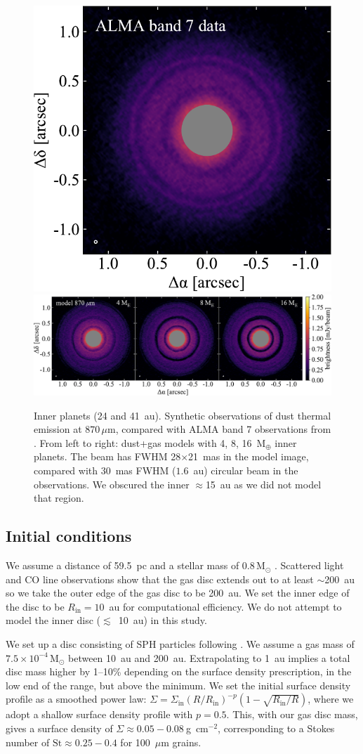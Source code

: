 \documentclass[usenatbib,a4paper,times]{mnras}
\newcommand{\st}{\mathrm{St}}
\renewcommand{\sun}{\mathrm{M}_{\odot}}
\renewcommand{\earth}{\mathrm{M}_{\oplus}}
\begin{document}
\begin{figure}
   \begin{center}
      \includegraphics[height=0.245\textwidth]{figs/andrews-2016.pdf} \quad
      \includegraphics[height=0.245\textwidth]{figs/alma-image.pdf}
      \caption{Inner planets (24 and 41~au). Synthetic observations of dust
         thermal emission at $870\,\mu$m, compared with ALMA band 7 observations
         from \citet{andrews:2016}. From left to right: dust+gas models with 4,
         8, 16~$\earth$ inner planets. The beam has FWHM 28$\times$21~mas in the
         model image, compared with 30~mas FWHM ($1.6$~au) circular beam in the
         observations. We obscured the inner $\approx$15~au as we did not model
         that region.\label{fig:alma}}
   \end{center}
\end{figure}





\subsection{Initial conditions}

We assume a distance of 59.5~pc \citep{gaia-collaboration:2016} and a stellar
mass of $0.8\,\sun{}$ \citep{andrews:2012}. Scattered light and CO line
observations show that the gas disc extends out to at least $\sim$200~au
\citep{thi:2010} so we take the outer edge of the gas disc to be 200~au. We set
the inner edge of the disc to be $R_{\mathrm{in}}=10$~au for computational
efficiency. We do not attempt to model the inner disc ($\lesssim$~10~au) in this
study.

We set up a disc consisting of SPH particles following \citet{lodato:2010}. We
assume a gas mass of $7.5\times 10^{-4}\,\sun{}$ between 10~au and 200~au.
Extrapolating to 1~au implies a total disc mass higher by 1--10\%
depending on the surface density prescription, in the low end of the
\citet{thi:2010} range, but above the \citet{teague:2018a} minimum.  We set the
initial surface density profile as a smoothed power law: $\Sigma =
\Sigma_{\mathrm{in}} {(R/R_{\mathrm{in}})}^{-p} (1-\sqrt{R_{\mathrm{in}}/R})$,
where we adopt a shallow surface density profile with $p=0.5$. This, with our
gas disc mass, gives a surface density of $\Sigma \approx 0.05-0.08\
$g~cm${}^{-2}$, corresponding to a Stokes number of $\st{}\approx 0.25-0.4$ for
100~$\mu$m grains.
\end{document}

